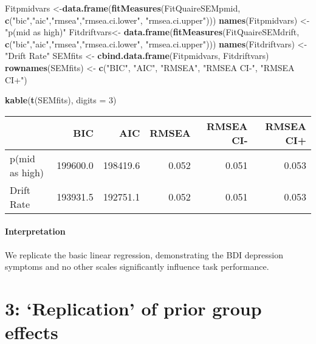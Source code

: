 \documentclass[]{article}
\newenvironment{Shaded}{\begin{snugshade}}{\end{snugshade}}
\newcommand{\KeywordTok}[1]{\textcolor[rgb]{0.13,0.29,0.53}{\textbf{#1}}}
\newcommand{\DataTypeTok}[1]{\textcolor[rgb]{0.13,0.29,0.53}{#1}}
\newcommand{\DecValTok}[1]{\textcolor[rgb]{0.00,0.00,0.81}{#1}}
\newcommand{\StringTok}[1]{\textcolor[rgb]{0.31,0.60,0.02}{#1}}
\newcommand{\NormalTok}[1]{#1}
\let\oldparagraph\paragraph
\renewcommand{\paragraph}[1]{\oldparagraph{#1}\mbox{}}
\begin{document}
\begin{Shaded}
\begin{Highlighting}[]
\NormalTok{Fitpmidvars <-}\KeywordTok{data.frame}\NormalTok{(}\KeywordTok{fitMeasures}\NormalTok{(FitQuaireSEMpmid, }\KeywordTok{c}\NormalTok{(}\StringTok{"bic"}\NormalTok{,}\StringTok{"aic"}\NormalTok{,}\StringTok{"rmsea"}\NormalTok{,}\StringTok{"rmsea.ci.lower"}\NormalTok{, }\StringTok{"rmsea.ci.upper"}\NormalTok{)))}
\KeywordTok{names}\NormalTok{(Fitpmidvars) <-}\StringTok{ "p(mid as high)"}
\NormalTok{Fitdriftvars<-}\StringTok{ }\KeywordTok{data.frame}\NormalTok{(}\KeywordTok{fitMeasures}\NormalTok{(FitQuaireSEMdrift, }\KeywordTok{c}\NormalTok{(}\StringTok{"bic"}\NormalTok{,}\StringTok{"aic"}\NormalTok{,}\StringTok{"rmsea"}\NormalTok{,}\StringTok{"rmsea.ci.lower"}\NormalTok{, }\StringTok{"rmsea.ci.upper"}\NormalTok{)))}
\KeywordTok{names}\NormalTok{(Fitdriftvars) <-}\StringTok{ "Drift Rate"}
\NormalTok{SEMfits <-}\StringTok{ }\KeywordTok{cbind.data.frame}\NormalTok{(Fitpmidvars, Fitdriftvars)}
\KeywordTok{rownames}\NormalTok{(SEMfits) <-}\StringTok{ }\KeywordTok{c}\NormalTok{(}\StringTok{"BIC"}\NormalTok{, }\StringTok{"AIC"}\NormalTok{, }\StringTok{"RMSEA"}\NormalTok{, }\StringTok{"RMSEA CI-"}\NormalTok{, }\StringTok{"RMSEA CI+"}\NormalTok{)}

\KeywordTok{kable}\NormalTok{(}\KeywordTok{t}\NormalTok{(SEMfits), }\DataTypeTok{digits =} \DecValTok{3}\NormalTok{)}
\end{Highlighting}
\end{Shaded}

\begin{longtable}[]{@{}lrrrrr@{}}
\toprule
& BIC & AIC & RMSEA & RMSEA CI- & RMSEA CI+\tabularnewline
\midrule
\endhead
p(mid as high) & 199600.0 & 198419.6 & 0.052 & 0.051 &
0.053\tabularnewline
Drift Rate & 193931.5 & 192751.1 & 0.052 & 0.051 & 0.053\tabularnewline
\bottomrule
\end{longtable}

\paragraph{Interpretation}\label{interpretation-3}

We replicate the basic linear regression, demonstrating the BDI
depression symptoms and no other scales significantly influence task
performance.

\section{\texorpdfstring{3: `Replication' of prior group
effects}{3: Replication of prior group effects}}\label{replication-of-prior-group-effects}
\end{document}

